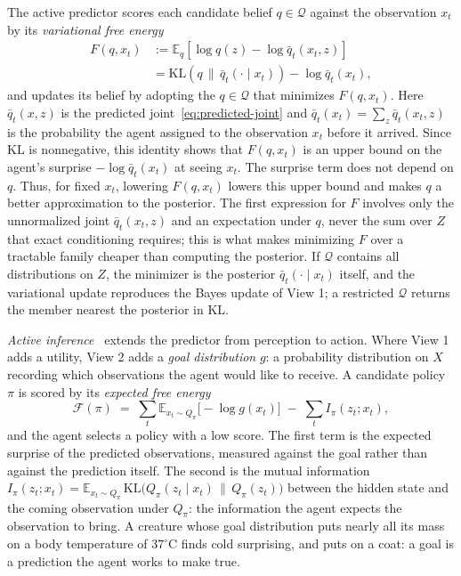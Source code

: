 The active predictor scores each candidate belief $q\in\mathcal Q$ against the observation $x_t$ by its \emph{variational free energy}
\begin{equation}\label{eq:vfe}
\begin{split}
   F(q,x_t) &:= \mathbb{E}_{q}\!\left[\log q(z)-\log \bar q_t(x_t,z)\right]\\
   &=\mathrm{KL}\!\left(q\,\big\|\,\bar q_t(\cdot\mid x_t)\right)-\log \bar q_t(x_t),
\end{split}
\end{equation}
and updates its belief by adopting the $q \in \mathcal Q$ that minimizes $F(q,x_t)$.
Here $\bar q_t(x,z)$ is the predicted joint~\eqref{eq:predicted-joint} and $\bar q_t(x_t)=\sum_z \bar q_t(x_t,z)$ is the probability the agent assigned to the observation $x_t$ before it arrived. Since KL is nonnegative, this identity shows that $F(q,x_t)$ is an upper bound on the agent's surprise $-\log \bar q_t(x_t)$ at seeing $x_t$. The surprise term does not depend on $q$. Thus, for fixed $x_t$, lowering $F(q,x_t)$ lowers this upper bound and makes $q$ a better approximation to the posterior. The first expression for $F$ involves only the unnormalized joint $\bar q_t(x_t,z)$ and an expectation under $q$, never the sum over $Z$ that exact conditioning requires; this is what makes minimizing $F$ over a tractable family cheaper than computing the posterior. If $\mathcal Q$ contains all distributions on $Z$, the minimizer is the posterior $\bar q_t(\cdot\mid x_t)$ itself, and the variational update reproduces the Bayes update of View 1; a restricted $\mathcal Q$ returns the member nearest the posterior in KL.

\emph{Active inference}~\cite{parr2022} extends the predictor from perception to action. Where View 1 adds a utility, View 2 adds a \emph{goal distribution} $g$: a probability distribution on $X$ recording which observations the agent would like to receive. A candidate policy $\pi$ is scored by its \emph{expected free energy}
\begin{equation}\label{eq:efe}
   \mathcal F(\pi)\;=\;\sum_t \mathbb{E}_{x_t\sim Q_\pi}\bigl[-\log g(x_t)\bigr]\;-\;\sum_t I_\pi(z_t;x_t),
\end{equation}
and the agent selects a policy with a low score. The first term is the expected surprise of the predicted observations, measured against the goal rather than against the prediction itself. The second is the mutual information $I_\pi(z_t;x_t)=\mathbb{E}_{x_t\sim Q_\pi}\,\mathrm{KL}\bigl(Q_\pi(z_t\mid x_t)\,\|\,Q_\pi(z_t)\bigr)$ between the hidden state and the coming observation under $Q_\pi$: the information the agent expects the observation to bring. A creature whose goal distribution puts nearly all its mass on a body temperature of $37^\circ$C finds cold surprising, and puts on a coat: a goal is a prediction the agent works to make true.

